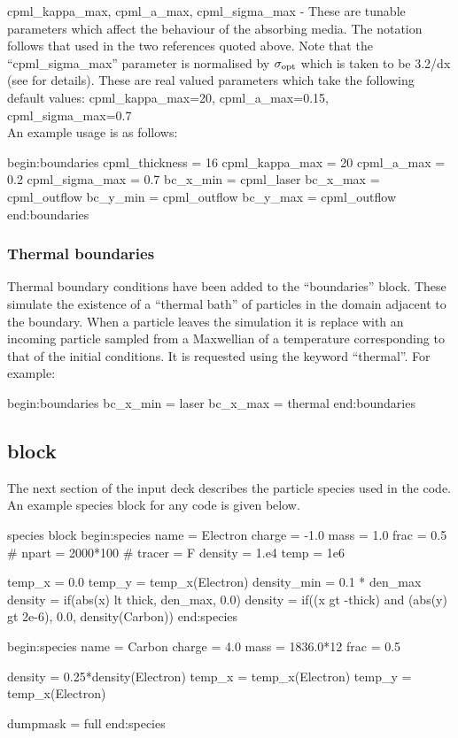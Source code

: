 {\emphtext cpml\_kappa\_max}, {\emphtext cpml\_a\_max},
{\emphtext cpml\_sigma\_max} - These are tunable parameters which affect the
  behaviour of the absorbing media. The notation follows that used in the two
  references quoted above. Note that the ``cpml\_sigma\_max'' parameter is
  normalised by $\sigma_{\rm opt}$ which is taken to be 3.2/dx (see
  \citet{Taflove} for details). These are real valued
  parameters which take the following default values: cpml\_kappa\_max=20,
  cpml\_a\_max=0.15, cpml\_sigma\_max=0.7\\

An example usage is as follows:

{\samepage
\begin{boxverbatim}
begin:boundaries
   cpml_thickness = 16
   cpml_kappa_max = 20
   cpml_a_max = 0.2
   cpml_sigma_max = 0.7
   bc_x_min = cpml_laser
   bc_x_max = cpml_outflow
   bc_y_min = cpml_outflow
   bc_y_max = cpml_outflow
end:boundaries
\end{boxverbatim}
}

\subsubsection{Thermal boundaries}
\label{sec:thermal}

Thermal boundary conditions have been added to the ``boundaries'' block.
These simulate the existence of a ``thermal bath'' of particles in the
domain adjacent to the boundary. When a particle leaves the simulation it is
replace with an incoming particle sampled from a Maxwellian of a temperature
corresponding to that of the initial conditions. It is requested using the
keyword ``thermal''.
For example:

\begin{boxverbatim}
begin:boundaries
   bc_x_min = laser
   bc_x_max = thermal
end:boundaries
\end{boxverbatim}


\subsection{ block}
\label{sec:species_block}
The next section of the input deck describes the particle species used in the
code. An example species block for any {\EPOCH} code is given below.
\begin{lboxverbatim}{species block}
begin:species
   name = Electron
   charge = -1.0
   mass = 1.0
   frac = 0.5
   # npart = 2000*100
   # tracer = F
   density = 1.e4
   temp = 1e6

   temp_x = 0.0
   temp_y = temp_x(Electron)
   density_min = 0.1 * den_max
   density = if(abs(x) lt thick, den_max, 0.0)
   density = if((x gt -thick) and (abs(y) gt 2e-6), 0.0, density(Carbon))
end:species

begin:species
   name = Carbon
   charge = 4.0
   mass = 1836.0*12
   frac = 0.5

   density = 0.25*density(Electron)
   temp_x = temp_x(Electron)
   temp_y = temp_x(Electron)

   dumpmask = full
end:species
\end{lboxverbatim}

